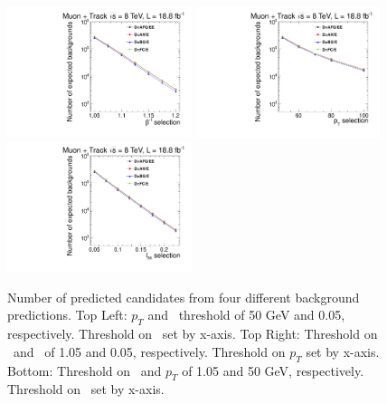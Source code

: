\begin{figure}
 \begin{center}
  \includegraphics[clip=false, trim=0.0cm 0cm 0.0cm 0cm, width=0.48\textwidth]{figures/tkmu/Systematics_Data8TeV_TOF_Value}
  \includegraphics[clip=false, trim=0.0cm 0cm 0.0cm 0cm, width=0.48\textwidth]{figures/tkmu/Systematics_Data8TeV_P_Value} \\
  \includegraphics[clip=false, trim=0.0cm 0cm 0.0cm 0cm, width=0.48\textwidth]{figures/tkmu/Systematics_Data8TeV_I_Value}
 \end{center}
 \caption[Number of predicted candidates from four different background predictions in the \tktof\ analysis]
{Number of predicted candidates from four different background predictions. Top Left: $p_T$ and \ias\ threshold of 50 GeV and 0.05, respectively.
Threshold on \invbeta\ set by x-axis. Top Right: Threshold on \invbeta\  and \ias\ of 1.05 and 0.05, respectively. Threshold on $p_T$ set by x-axis.
Bottom: Threshold on \invbeta\ and $p_T$ of 1.05 and 50 GeV, respectively. Threshold on \ias\ set by x-axis. }
\label{fig:TkMuMultPred}
\end{figure}

